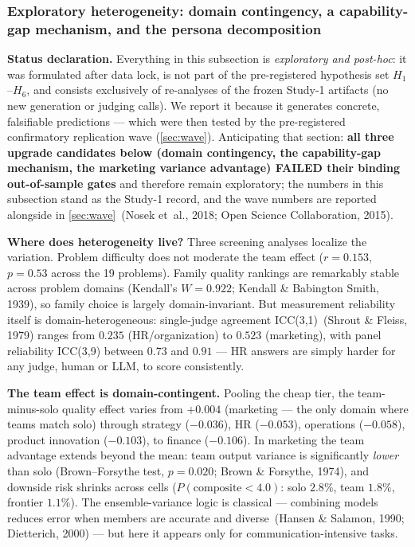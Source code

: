 \documentclass[12pt,a4paper]{article}
\begin{document}
\subsubsection{Exploratory heterogeneity: domain contingency, a capability-gap mechanism, and the persona decomposition}\label{sec:exploratory-heterogeneity}

\textbf{Status declaration.} Everything in this subsection is \emph{exploratory
and post-hoc}: it was formulated after data lock, is not part of the
pre-registered hypothesis set $H_1$--$H_6$, and consists exclusively of
re-analyses of the frozen Study-1 artifacts (no new generation or judging
calls). We report it because it generates concrete, falsifiable predictions ---
which were then tested by the pre-registered confirmatory replication wave
(\cref{sec:wave}). Anticipating that section: \textbf{all three upgrade
candidates below (domain contingency, the capability-gap mechanism, the
marketing variance advantage) FAILED their binding out-of-sample gates} and
therefore remain exploratory; the numbers in this subsection stand as the
Study-1 record, and the wave numbers are reported alongside in
\cref{sec:wave}~(Nosek et~al., 2018; Open Science Collaboration, 2015).

\textbf{Where does heterogeneity live?} Three screening analyses localize the
variation. Problem difficulty does not moderate the team effect
($r = 0.153$, $p = 0.53$ across the 19 problems). Family quality rankings are
remarkably stable across problem domains (Kendall's $W = 0.922$;
Kendall \& Babington Smith, 1939), so family choice is largely
domain-invariant. But measurement reliability itself is domain-heterogeneous:
single-judge agreement ICC(3,1)~(Shrout \& Fleiss, 1979) ranges from $0.235$
(HR/organization) to $0.523$ (marketing), with panel reliability ICC(3,9)
between $0.73$ and $0.91$ --- HR answers are simply harder for any judge,
human or LLM, to score consistently.

\textbf{The team effect is domain-contingent.} Pooling the cheap tier, the
team-minus-solo quality effect varies from $+0.004$ (marketing --- the only
domain where teams match solo) through strategy ($-0.036$), HR ($-0.053$),
operations ($-0.058$), product innovation ($-0.103$), to finance
($-0.106$). In marketing the team advantage extends beyond the mean: team
output variance is significantly \emph{lower} than solo (Brown--Forsythe test,
$p = 0.020$; Brown \& Forsythe, 1974), and downside risk shrinks across cells
($P(\text{composite} < 4.0)$: solo $2.8\%$, team $1.8\%$, frontier $1.1\%$).
The ensemble-variance logic is classical --- combining models reduces error
when members are accurate and diverse~(Hansen \& Salamon, 1990; Dietterich,
2000) --- but here it appears only for communication-intensive tasks.
\end{document}
